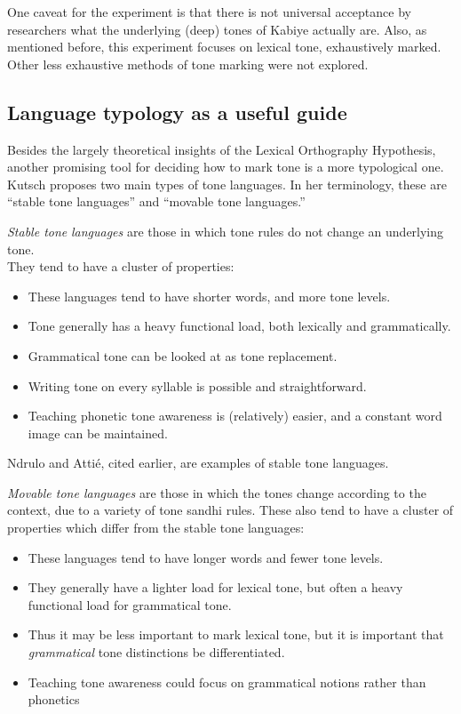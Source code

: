 \documentclass[output=paper]{langscibook}
\begin{document}
One caveat for the experiment is that there is not universal acceptance by researchers what the underlying (deep) tones of Kabiye actually are. Also, as mentioned before, this experiment focuses on lexical tone, exhaustively marked. Other less exhaustive methods of tone marking were not explored.

\subsection{Language typology as a useful guide}
\label{sec:PhonTheoryOrtho:LanguageTypo:2}

Besides the largely theoretical insights of the Lexical Orthography Hypothesis, another promising tool for deciding how to mark tone is a more typological one. Kutsch \citet{Kutsch2014} proposes two main types of tone languages. In her terminology, these are “stable tone languages” and “movable tone languages.”

\textit{Stable tone} \textit{languages} are those in which tone rules do not change an underlying tone. \\
They tend to have a cluster of properties:

\begin{itemize}

    \item These languages tend to have shorter words, and more tone levels. 
    \item Tone generally has a heavy functional load, both lexically and grammatically. 
    \item Grammatical tone can be looked at as tone replacement. 
    \item Writing tone on every syllable is possible and straightforward. 
    \item Teaching phonetic tone awareness is (relatively) easier, and a constant word image can be maintained.
\end{itemize}

Ndrulo and Attié, cited earlier, are examples of stable tone languages. 

\textit{Movable tone languages} are those in which the tones change according to the context, due to a variety of tone sandhi rules. These also tend to have a cluster of properties which differ from the stable tone languages:

\begin{itemize}
    \item These languages tend to have longer words and fewer tone levels. 
    \item They generally have a lighter load for lexical tone, but often a heavy functional load for grammatical tone. 
    \item Thus it may be less important to mark lexical tone, but it is important that \textit{grammatical} tone distinctions be differentiated.
    \item Teaching tone awareness could focus on grammatical notions rather than phonetics 
\end{itemize}
\end{document}
